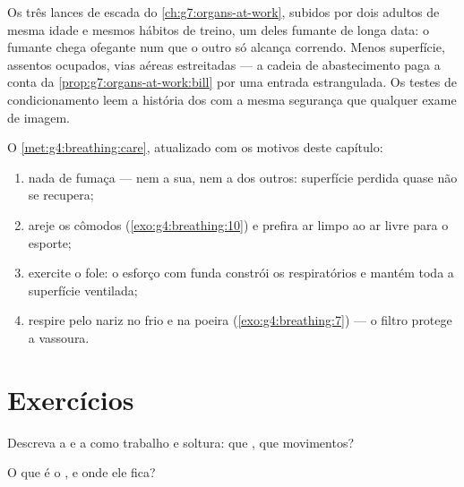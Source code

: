 \begin{example}\label{ex:g7:lungs-and-gas-exchange:stairs}
Os três lances de escada do \cref{ch:g7:organs-at-work}, subidos por
dois adultos de mesma idade e mesmos hábitos de treino, um deles
fumante de longa data: o fumante chega ofegante num  que o outro
só alcança correndo. Menos superfície, assentos ocupados, vias aéreas
estreitadas --- a cadeia de abastecimento paga a conta da
\cref{prop:g7:organs-at-work:bill} por uma entrada estrangulada. Os
testes de condicionamento leem a história dos  com a mesma
segurança que qualquer exame de imagem.
\end{example}

\begin{method}\label{met:g7:lungs-and-gas-exchange:keep}
O \cref{met:g4:breathing:care}, atualizado com os motivos deste
capítulo:
\begin{enumerate}
  \item nada de fumaça --- nem a sua, nem a dos outros: superfície
        perdida quase não se recupera;
  \item areje os cômodos (\cref{exo:g4:breathing:10}) e prefira ar
        limpo ao ar livre para o esporte;
  \item exercite o fole: o esforço com  funda constrói os
         respiratórios e mantém toda a superfície ventilada;
  \item respire pelo nariz no frio e na poeira
        (\cref{exo:g4:breathing:7}) --- o filtro protege a vassoura.
\end{enumerate}
\end{method}

\section{Exercícios}

\begin{exercise}[$\star$]\label{exo:g7:lungs-and-gas-exchange:1}
Descreva a  e a  como trabalho e soltura: que
, que movimentos?
\end{exercise}

\begin{exercise}[$\star$]\label{exo:g7:lungs-and-gas-exchange:2}
O que é o , e onde ele fica?
\end{exercise}

